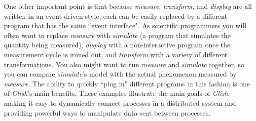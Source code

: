   One other
important point is that because {\em measure\/}, {\em transform\/}, and
{\em display} are all written in an event-driven style, each can be
easily replaced by a different program that has the same ``event
interface".
As  scientific programmers you will often want to
replace {\em measure} with {\em simulate\/} (a program that 
simulates the
quantity being measured), {\em display} with a non-interactive 
program once the measurement cycle is ironed out, 
and {\em transform} with a
variety of different transformations.  You also might want to run
{\em measure} and {\em simulate} together, so you can 
compare {\em simulate\/}'s
model with the actual phenomenon measured by {\em measure\/}.  The ability
to quickly ``plug in" different programs in this fashion is one of
{\em Glish}'s main benefits.  These examples illustrate the main goals
of {\em Glish}: making it easy to dynamically 
connect processes in a distributed system and providing powerful ways
to manipulate data sent between processes.
